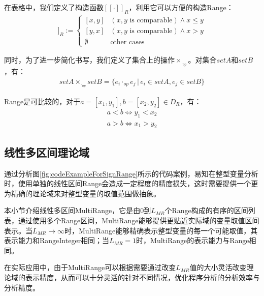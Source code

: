 在表格中，我们定义了构造函数$ [[\cdot]]_R $，利用它可以方便的构造Range：
\begin{align}
[[x, y]]_R := \begin{cases}
[x, y] & (x, y \text{ is comparable}) \land x \le y\\
[y, x] & (x, y \text{ is comparable}) \land x > y\\
\emptyset & \text{other cases}
\end{cases}
\end{align}

同时，为了进一步简化书写，我们定义了集合上的操作$ \times_{\cdot_{op}} $。对集合$ setA $和$ setB $，有：
\begin{align}
setA  \times_{\cdot_{op}} setB =  \{ e_i \cdot_{op} e_j \, | \, e_i \in setA, e_j \in setB \} 
\end{align}

Range是可比较的，对于$ a = [x_1, y_1], b = [x_2, y_2] \in D_R $，有：
\begin{align}
	a < b \iff y_1 < x_2\\
	a > b \iff x_1 > y_2
\end{align}

\subsection{线性多区间理论域}
\label{sec:MultiRange}

通过分析图\ref{fig:codeExampleForSignRange}所示的代码案例，易知在整型变量分析时，使用单独的线性区间Range会造成一定程度的精度损失，这时需要提供一个更为精确的理论域来对整型变量的取值范围做抽象。

本小节介绍线性多区间MultiRange，它是由0到$ L_{MR} $个Range构成的有序的区间列表，通过使用多个Range区间，MultiRange能够提供更贴近实际域的变量取值区间表示。当$ L_{MR}  \rightarrow \infty $时，MultiRange能够精确表示整型变量的每一个可能取值，其表示能力和RangeInteger相同；当$ L_{MR} = 1 $时，MultiRange的表示能力与Range相同。

在实际应用中，由于MultiRange可以根据需要通过改变$ L_{MR} $值的大小灵活改变理论域的表示精度，从而可以十分灵活的针对不同情况，优化程序分析的分析效率与分析精度。

